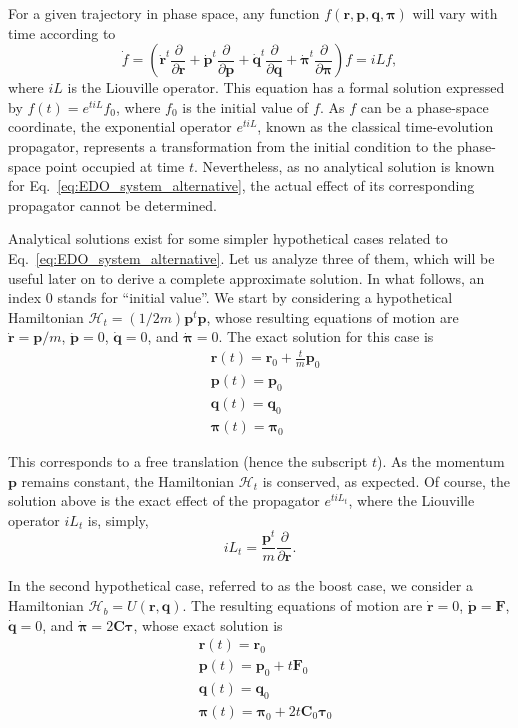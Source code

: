\documentclass[aip,jcp,reprint,amsmath,amssymb,raggedbottom]{revtex4-1}
\newcommand{\mt}[1]{\boldsymbol{\mathbf{#1}}}           %
\newcommand{\vt}[1]{\boldsymbol{\mathbf{#1}}}           %
\newcommand{\tr}[1]{#1^t}                               %
\newcommand{\diff}[2]{\dfrac{\partial #1}{\partial #2}} %
\begin{document}
For a given trajectory in phase space, any function $f(\vt r, \vt p, \vt q, \vt \pi)$ will vary with time according to
\[
\dot{f} = \left( \tr{\dot{\vt r}} \diff{}{\vt r} + \tr{\dot{\vt p}} \diff{}{\vt p} + \tr{\dot{\vt q}} \diff{}{\vt q} + \tr{\dot{\vt \pi}} \diff{}{\vt \pi} \right) f = i\!L f,
\]
where $i\!L$ is the Liouville operator. This equation has a formal solution expressed by $f(t) = e^{t i\!L}f_0$, where $f_0$ is the initial value of $f$. As $f$ can be a phase-space coordinate, the exponential operator $e^{t i\!L}$, known as the classical time-evolution propagator,\cite{Tuckerman2008} represents a transformation from the initial condition to the phase-space point occupied at time $t$. Nevertheless, as no analytical solution is known for Eq.~\ref{eq:EDO_system_alternative}, the actual effect of its corresponding propagator cannot be determined.

Analytical solutions exist for some simpler hypothetical cases related to Eq.~\ref{eq:EDO_system_alternative}. Let us analyze three of them, which will be useful later on to derive a complete approximate solution. In what follows, an index $0$ stands for ``initial value''. We start by considering a hypothetical Hamiltonian $\mathcal{H}_t = (1/2m) \tr{\vt p} \vt p$, whose resulting equations of motion are $\dot{\vt r} = {\vt p}/m$, $\dot{\vt p} = 0$, $\dot{\vt q} = 0$, and $\dot{\vt \pi} = 0$. The exact solution for this case is
\begin{align*}
&{\vt r}(t) = {\vt r}_0 + \frac{t}{m} {\vt p}_0 \\
&{\vt p}(t) = {\vt p}_0 \\
&{\vt q}(t) = {\vt q}_0 \\
&{\vt \pi}(t) = {\vt \pi}_0
\end{align*}

This corresponds to a free translation (hence the subscript $t$). As the momentum $\vt p$ remains constant, the Hamiltonian $\mathcal{H}_t$ is conserved, as expected. Of course, the solution above is the exact effect of the propagator $e^{t i\!L_t}$, where the Liouville operator $i\!L_t$ is, simply,
\[
i L_t = \frac{\tr{\vt p}}{m}\diff{}{\vt r}.
\]

In the second hypothetical case, referred to as the boost case, we consider a Hamiltonian $\mathcal{H}_b = U(\vt r, \vt q)$. The resulting equations of motion are $\dot{\vt r} = 0$, $\dot{\vt p} = \vt F$, $\dot{\vt q} = 0$, and $\dot{\vt \pi} = 2 \mt C \vt \tau$, whose exact solution is
\begin{align*}
&{\vt r}(t) = {\vt r}_0 \\
&{\vt p}(t) = {\vt p}_0 + t \vt F_0 \\
&{\vt q}(t) = {\vt q}_0 \\
&{\vt \pi}(t) = {\vt \pi}_0 +  2 t \mt C_0 \vt \tau_0
\end{align*}
\end{document}
